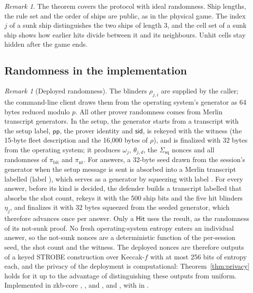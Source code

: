 \documentclass[11pt]{article}
\theoremstyle{definition}
\theoremstyle{remark}
\newtheorem{remark}[lemma]{Remark}
\newcommand{\sid}{\mathsf{sid}}
\newcommand{\pp}{\mathsf{pp}}
\newcommand{\Sq}{\Sigma_{\mathrm{sq}}}
\begin{document}
\begin{remark}
The theorem covers the protocol with ideal randomness. Ship lengths, the rule set and the order of ships are public, as in the physical game. The index $j$ of a sunk ship distinguishes the two ships of length $3$, and the cell set of a sunk ship shows how earlier hits divide between it and its neighbours. Unhit cells stay hidden after the game ends.
\end{remark}

\subsection{Randomness in the implementation}\label{sec:randomness}
\begin{remark}[Deployed randomness]\label{rem:nonces}
The blinders $\rho_{j,i}$ are supplied by the caller; the command-line client draws them from the operating system's generator as 64 bytes reduced modulo $p$. All other prover randomness comes from Merlin transcript generators. In the setup, the generator starts from a transcript with the setup label, $\pp$, the prover identity and $\sid$, is rekeyed with the witness (the 15-byte fleet description and the 16,000 bytes of $\rho$), and is finalized with 32 bytes from the operating system; it produces $\omega_j$, $\theta_{j,d}$, the $\Sq$ nonces and all randomness of $\pi_{\mathrm{bit}}$ and $\pi_{\mathrm{nt}}$. For answers, a 32-byte seed drawn from the session's generator when the setup message is sent is absorbed into a Merlin transcript labelled  (label ), which serves as a generator by squeezing with label . For every answer, before its kind is decided, the defender builds a transcript labelled  that absorbs the shot count, rekeys it with the 500 ship bits and the five hit blinders $\eta_j$, and finalizes it with 32 bytes squeezed from the seeded generator, which therefore advances once per answer. Only a $\mathsf{Hit}$ uses the result, as the randomness of its not-sunk proof. No fresh operating-system entropy enters an individual answer, so the not-sunk nonces are a deterministic function of the per-session seed, the shot count and the witness. The deployed nonces are therefore outputs of a keyed STROBE construction over Keccak-$f$ with at most 256 bits of entropy each, and the privacy of the deployment is computational: Theorem~\ref{thm:privacy} holds for it up to the advantage of distinguishing these outputs from uniform. Implemented in zkb-core , , and ,  and , with  in .
\end{remark}
\end{document}
